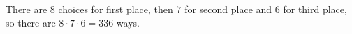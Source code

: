 There are $8$ choices for first place, then $7$ for second place and $6$ for third place, so there are $8\cdot7\cdot6=\boxed{336}$ ways.
